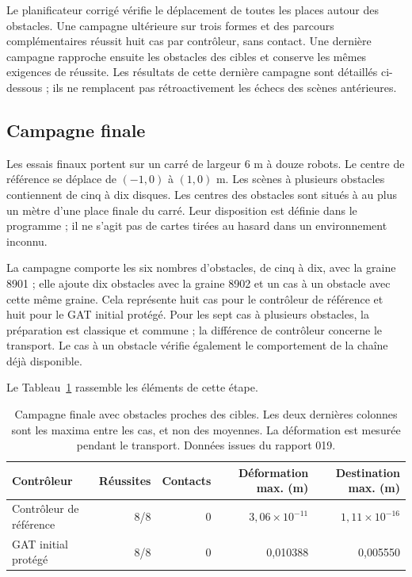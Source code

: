 Le planificateur corrigé vérifie le déplacement de toutes les places autour des obstacles. Une campagne ultérieure sur trois formes et des parcours complémentaires réussit huit cas par contrôleur, sans contact. Une dernière campagne rapproche ensuite les obstacles des cibles et conserve les mêmes exigences de réussite. Les résultats de cette dernière campagne sont détaillés ci-dessous ; ils ne remplacent pas rétroactivement les échecs des scènes antérieures.

\subsection{Campagne finale}
Les essais finaux portent sur un carré de largeur 6 m à douze robots. Le centre de référence se déplace de $(-1,0)$ à $(1,0)$ m. Les scènes à plusieurs obstacles contiennent de cinq à dix disques. Les centres des obstacles sont situés à au plus un mètre d'une place finale du carré. Leur disposition est définie dans le programme ; il ne s'agit pas de cartes tirées au hasard dans un environnement inconnu.

La campagne comporte les six nombres d'obstacles, de cinq à dix, avec la graine 8901 ; elle ajoute dix obstacles avec la graine 8902 et un cas à un obstacle avec cette même graine. Cela représente huit cas pour le contrôleur de référence et huit pour le GAT initial protégé. Pour les sept cas à plusieurs obstacles, la préparation est classique et commune ; la différence de contrôleur concerne le transport. Le cas à un obstacle vérifie également le comportement de la chaîne déjà disponible.

Le Tableau~\ref{tab:navigation} rassemble les éléments de cette étape.
\begin{table}[htbp]
\caption{Campagne finale avec obstacles proches des cibles. Les deux dernières colonnes sont les maxima entre les cas, et non des moyennes. La déformation est mesurée pendant le transport. Données issues du rapport 019.}
\label{tab:navigation}
\centering\small
\setlength{\tabcolsep}{3pt}
\begin{tabular}{lrrrr}
\toprule
Contrôleur & Réussites & Contacts & Déformation max. (m) & Destination max. (m)\\\midrule
Contrôleur de référence & 8/8 & 0 & $3{,}06\times10^{-11}$ & $1{,}11\times10^{-16}$\\
GAT initial protégé & 8/8 & 0 & 0,010388 & 0,005550\\\bottomrule
\end{tabular}


\end{table}


